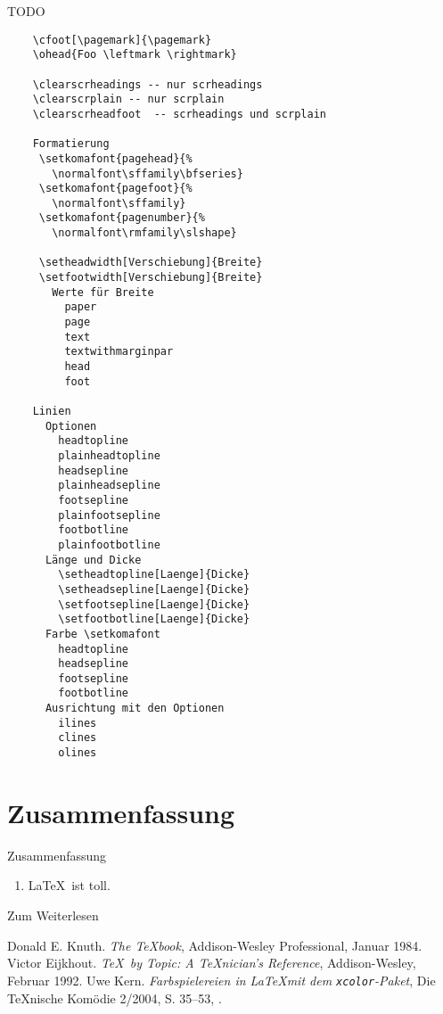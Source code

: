 \begin{Frame}{TODO}
  \begin{verbatim}
    \cfoot[\pagemark]{\pagemark}
    \ohead{Foo \leftmark \rightmark}
    
    \clearscrheadings -- nur scrheadings
    \clearscrplain -- nur scrplain
    \clearscrheadfoot  -- scrheadings und scrplain
    
    Formatierung
     \setkomafont{pagehead}{%
       \normalfont\sffamily\bfseries}
     \setkomafont{pagefoot}{%
       \normalfont\sffamily}
     \setkomafont{pagenumber}{%
       \normalfont\rmfamily\slshape}
    
     \setheadwidth[Verschiebung]{Breite}
     \setfootwidth[Verschiebung]{Breite}
       Werte für Breite
         paper
         page
         text
         textwithmarginpar
         head
         foot
    
    Linien
      Optionen
        headtopline
        plainheadtopline
        headsepline
        plainheadsepline
        footsepline
        plainfootsepline
        footbotline
        plainfootbotline
      Länge und Dicke
        \setheadtopline[Laenge]{Dicke}
        \setheadsepline[Laenge]{Dicke}
        \setfootsepline[Laenge]{Dicke}
        \setfootbotline[Laenge]{Dicke}
      Farbe \setkomafont
        headtopline
        headsepline
        footsepline
        footbotline
      Ausrichtung mit den Optionen
        ilines
        clines
        olines
  \end{verbatim}
\end{Frame}

\section*{Zusammenfassung}

\begin{frame}{Zusammenfassung}
  \begin{enumerate}
    \item \LaTeX\ ist toll.
  \end{enumerate}
\end{frame}

\begin{Frame}[fragile]{Zum Weiterlesen}
  \begin{mybib}
      Donald E. Knuth.
      \newblock \emph{The \TeX book},
      \newblock Addison-Wesley Professional, Januar 1984.
      Victor Eijkhout.
      \newblock \emph{\TeX\ by Topic: A \TeX nician's Reference},
      \newblock Addison-Wesley, Februar 1992.
      Uwe Kern.
      \newblock \emph{Farbspielereien in \LaTeX mit dem \texttt{xcolor}-Paket},
      \newblock Die \TeX nische Komödie 2/2004, S. 35--53,
      \newblock {}.
  \end{mybib}
\end{Frame}